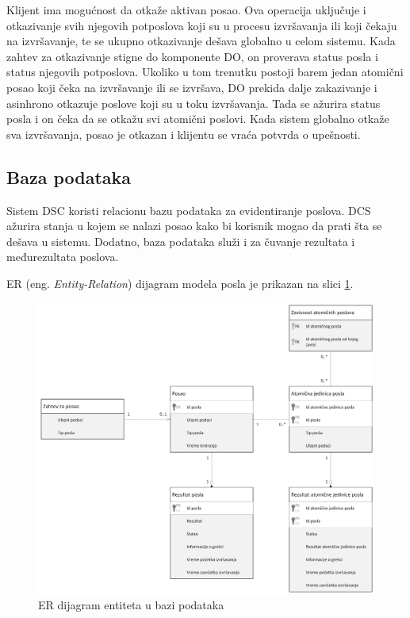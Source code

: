 \documentclass[12pt,oneside]{memoir}
\begin{document}
Klijent ima mogućnost da otkaže aktivan posao. Ova operacija uključuje i otkazivanje svih njegovih potposlova koji su u procesu izvršavanja ili koji čekaju na izvršavanje, te se ukupno otkazivanje dešava globalno u celom sistemu.
Kada zahtev za otkazivanje stigne do komponente DO, on proverava status posla i status njegovih potposlova. Ukoliko u tom trenutku postoji barem jedan atomični posao koji čeka na izvršavanje ili se izvršava, DO prekida dalje zakazivanje i asinhrono otkazuje poslove koji su u toku izvršavanja. Tada se ažurira status posla i on čeka da se otkažu svi atomični poslovi. Kada sistem globalno otkaže sva izvršavanja, posao je otkazan i klijentu se vraća potvrda o upešnosti.


\subsection{Baza podataka}

Sistem DSC koristi relacionu bazu podataka za evidentiranje poslova. DCS ažurira stanja u kojem se nalazi posao kako bi korisnik mogao da prati šta se dešava u sistemu. Dodatno, baza podataka služi i za čuvanje rezultata i međurezultata poslova.

ER (eng. \emph{Entity-Relation}) dijagram modela posla je prikazan na slici \ref{fig:erposao}.

\begin{figure}[!ht]
  \centering
  \includegraphics[width=1.0\textwidth]{./images/uml_er_dijagram_posao.png}
  \caption{ER dijagram entiteta u bazi podataka}
  \label{fig:erposao}
\end{figure}
\end{document}
